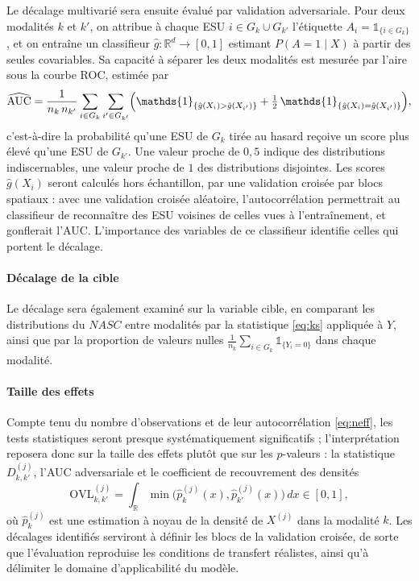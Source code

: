 			Le décalage multivarié sera ensuite évalué par validation adversariale. Pour deux modalités $k$ et $k'$, on attribue à chaque ESU $i \in G_k \cup G_{k'}$ l'étiquette $A_i = \mathds{1}_{\{i \in G_k\}}$, et on entraîne un classifieur $\hat g : \mathbb{R}^d \to [0, 1]$ estimant $P(A = 1 \mid X)$ à partir des seules covariables. Sa capacité à séparer les deux modalités est mesurée par l'aire sous la courbe ROC, estimée par
			\begin{equation}\label{eq:auc}
				\widehat{\mathrm{AUC}} = \frac{1}{n_k \, n_{k'}} \sum_{i \in G_k} \sum_{i' \in G_{k'}}
				\Bigl( \mathds{1}_{\{\hat g(X_i) > \hat g(X_{i'})\}} + \tfrac{1}{2} \, \mathds{1}_{\{\hat g(X_i) = \hat g(X_{i'})\}} \Bigr),
			\end{equation}
			c'est-à-dire la probabilité qu'une ESU de $G_k$ tirée au hasard reçoive un score plus élevé qu'une ESU de $G_{k'}$. Une valeur proche de $0{,}5$ indique des distributions indiscernables, une valeur proche de $1$ des distributions disjointes. Les scores $\hat g(X_i)$ seront calculés hors échantillon, par une validation croisée par blocs spatiaux : avec une validation croisée aléatoire, l'autocorrélation permettrait au classifieur de reconnaître des ESU voisines de celles vues à l'entraînement, et gonflerait l'AUC. L'importance des variables de ce classifieur identifie celles qui portent le décalage.
		
		\paragraph{Décalage de la cible}
			Le décalage sera également examiné sur la variable cible, en comparant les distributions du $NASC$ entre modalités par la statistique \eqref{eq:ks} appliquée à $Y$, ainsi que par la proportion de valeurs nulles $\frac{1}{n_k} \sum_{i \in G_k} \mathds{1}_{\{Y_i = 0\}}$ dans chaque modalité.
		
		\paragraph{Taille des effets}
			Compte tenu du nombre d'observations et de leur autocorrélation \eqref{eq:neff}, les tests statistiques seront presque systématiquement significatifs ; l'interprétation reposera donc sur la taille des effets plutôt que sur les $p$-valeurs : la statistique $D_{k,k'}^{(j)}$, l'AUC adversariale et le coefficient de recouvrement des densités
			\begin{equation}\label{eq:ovl}
				\mathrm{OVL}_{k,k'}^{(j)} = \int_{\mathbb{R}} \min\bigl(\hat p_k^{(j)}(x), \hat p_{k'}^{(j)}(x)\bigr) \, dx \in [0, 1],
			\end{equation}
			où $\hat p_k^{(j)}$ est une estimation à noyau de la densité de $X^{(j)}$ dans la modalité $k$. Les décalages identifiés serviront à définir les blocs de la validation croisée, de sorte que l'évaluation reproduise les conditions de transfert réalistes, ainsi qu'à délimiter le domaine d'applicabilité du modèle.